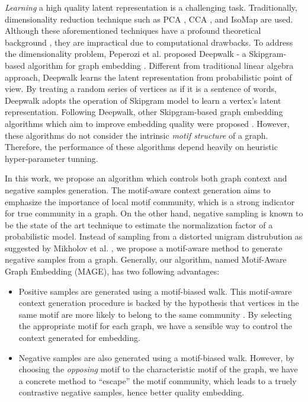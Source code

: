 \documentclass[letterpaper]{article}
\begin{document}

        \emph{Learning} a high quality latent representation is a challenging task. Traditionally,
        dimensionality reduction technique such as PCA \cite{pca}, CCA \cite{cca}, and IsoMap 
        \cite{IsoMap} are used. Although these aforementioned techniques have a profound theoretical
        background \cite{++++++}, they are impractical due to computational drawbacks. To address
        the dimensionality problem, Peperozi et al. proposed Deepwalk - a Skipgram-based algorithm
        for graph embedding \cite{deepwalk}. Different from traditional linear algebra approach,
        Deepwalk learns the latent representation from probabilistic point of view. By treating
        a random series of vertices as if it is a sentence of words, Deepwalk adopts the operation
        of Skipgram model \cite{skipgram} to learn a vertex's latent representation. Following
        Deepwalk, other Skipgram-based graph embedding algorithms which aim to improve embedding
        quality were proposed \cite{GraRep, LINE, platenoid, node2vec}. However, these algorithms
        do not consider the intrinsic \emph{motif structure} of a graph. Therefore, the performance
        of these algorithms depend heavily on heuristic hyper-parameter tunning.


        In this work, we propose an algorithm which controls both graph context and negative samples
        generation. The motif-aware context generation aims to emphasize the importance of local
        motif community, which is a strong indicator for true community in a graph. On the other hand,
        negative sampling is known to be the state of the art technique to estimate the normalization
        factor of a probabilistic model. Instead of sampling from a distorted unigram distrubution as
        suggested by Mikholov et al. \cite{skipgram}, we propose a motif-aware method to generate 
        negative samples from a graph. Generally, our algorithm, named Motif-Aware Graph Embedding (MAGE),
        has two following advantages:

        \begin{itemize}
            \setlength{\parskip}{0pt}
            \item Positive samples are generated using a motif-biased walk. This motif-aware context 
                generation procedure is backed by the hypothesis that vertices in the same motif
                are more likely to belong to the same community \cite{juremotif, harvardmotif}.
                By selecting the appropriate motif for each graph, we have a sensible way to control
                the context generated for embedding.
            \item Negative samples are also generated using a motif-biased walk. However, by choosing
                the \emph{opposing} motif to the characteristic motif of the graph, we have a concrete
                method to ``escape'' the motif community, which leads to a truely contrastive negative
                samples, hence better quality embedding.
        \end{itemize}
\end{document}
